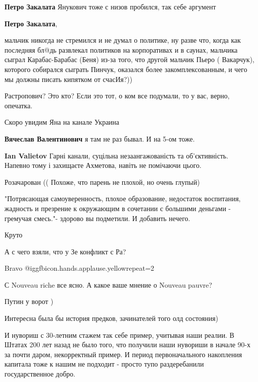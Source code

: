 \begin{itemize}
\begin{itemize}
\textbf{Петро Закалата} Янукович тоже с низов пробился, так себе аргумент

\textbf{Петро Закалата}, 

мальчик никогда не стремился и не думал о политике, ну разве что, когда как
последняя бл@дь развлекал политиков на корпоративах и в саунах, мальчика сыграл
Карабас-Барабас (Беня) из-за того, что другой мальчик Пьеро ( Вакарчук),
которого собирался сыграть Пинчук, оказался более закомплексованным, и чего мы
должны писать кипятком от счасИя?))

\end{itemize} %

Растропович? Это кто? Если это тот, о ком все подумали, то у вас, верно, опечатка.

Скоро увидим Яна на канале Украина

\begin{itemize} %
\textbf{Вячеслав Валентинович} я там не раз бывал. И на 5-ом тоже.

\textbf{Ian Valietov} Гарні канали, суцільна незаангажованість та об'єктивність. Напевно тому і захищаєте Ахметова, навіть не помічаючи цього.
\end{itemize} %

Розачарован (( Похоже, что парень не плохой, но очень глупый)


"Потрясающая самоуверенность, плохое образование, недостаток воспитания,
жадность и презрение к окружающим в сочетании с большими деньгами - гремучая
смесь."- здорово вы подметили. И добавить нечего.


Круто

А с чего взяли, что у Зе конфликт с Ра?

Bravo @igg{fbicon.hands.applause.yellow}{repeat=2} 

С Nouveau riche все ясно. А какое ваше мнение о Nouveau pauvre?

Путин у ворот )


Интересна была бы история предков, зачинателей того олд состояния)

И нувориш с 30-летним стажем так себе пример, учитывая наши реалии. В Штатах
200 лет назад не было того, что получили наши нувориши в начале 90-х за почти
даром, некорректный пример. И период первоначального накопления капитала тоже к
нашим не подходит - просто тупо раздеребанили государственное добро.


\end{itemize}
